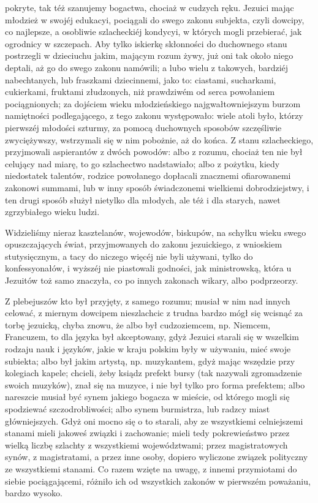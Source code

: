 \documentclass{book}
\begin{document}
pokryte, tak téż szanujemy bogactwa, chociaż w cudzych ręku. Jezuici mając młodzież w swojéj edukacyi, pociągali do swego zakonu subjekta, czyli dowcipy, co najlepsze, a osobliwie szlacheckiéj kondycyi, w których mogli przebierać, jak ogrodnicy w szczepach. Aby tylko iskierkę skłonności do duchownego stanu postrzegli w dzieciuchu jakim, mającym rozum żywy, już oni tak około niego deptali, aż go do swego zakonu namówili; a lubo wielu z takowych, bardziéj nabechtanych, lub fraszkami dziecinnemi, jako to: ciastami, sucharkami, cukierkami, fruktami złudzonych, niż prawdziwém od serca powołaniem pociągnionych; za dojściem wieku młodzieńskiego najgwałtowniejszym burzom namiętności podlegającego, z tego zakonu występowało: wiele atoli było, którzy pierwszéj młodości szturmy, za pomocą duchownych sposobów szczęśliwie zwyciężywszy, wstrzymali się w nim pobożnie, aż do końca. Z stanu szlacheckiego, przyjmowali aspierantów z dwóch powodów: albo z rozumu, chociaż ten nie był celujący nad miarę, to go szlachectwo nadstawiało; albo z pożytku, kiedy niedostatek talentów, rodzice powołanego dopłacali znacznemi ofiarowanemi zakonowi summami, lub w inny sposób świadczonemi wielkiemi dobrodziejstwy, i ten drugi sposób służył nietylko dla młodych, ale téż i dla starych, nawet zgrzybiałego wieku ludzi.

Widzieliśmy nieraz kasztelanów, wojewodów, biskupów, na schyłku wieku swego opuszczających świat, przyjmowanych do zakonu jezuickiego, z wnioskiem stutysięcznym, a tacy do niczego więcéj nie byli używani, tylko do konfessyonałów, i wyższéj nie piastowali godności, jak ministrowską, która u Jezuitów toż samo znaczyła, co po innych zakonach wikary, albo podprzeorzy.

Z plebejuszów kto był przyjęty, z samego rozumu; musiał w nim nad innych celować, z miernym dowcipem nieszlachcic z trudna bardzo mógł się wcisnąć za torbę jezuicką, chyba znowu, że albo był cudzoziemcem, np. Niemcem, Francuzem, to dla języka był akceptowany, gdyż Jezuici starali się w wszelkim rodzaju nauk i języków, jakie w kraju polskim były w używaniu, mieć swoje subiekta; albo był jakim artystą, np. muzykantem, gdyż mając wszędzie przy kolegiach kapele; chcieli, żeby ksiądz prefekt bursy (tak nazywali zgromadzenie swoich muzyków), znał się na muzyce, i nie był tylko pro forma prefektem; albo nareszcie musiał być synem jakiego bogacza w mieście, od którego mogli się spodziewać szczodrobliwości; albo synem burmistrza, lub radzcy miast główniejszych. Gdyż oni mocno się o to starali, aby ze wszystkiemi celniejszemi stanami mieli jakoweś związki i zachowanie; mieli tedy pokrewieństwo przez wielką liczbę szlachty z wszystkiemi województwami; przez magistratowych synów, z magistratami, a przez inne osoby, dopiero wyliczone związek polityczny ze wszystkiemi stanami. Co razem wzięte na uwagę, z innemi przymiotami do siebie pociągającemi, różniło ich od wszystkich zakonów w pierwszém poważaniu, bardzo wysoko.
\end{document}
